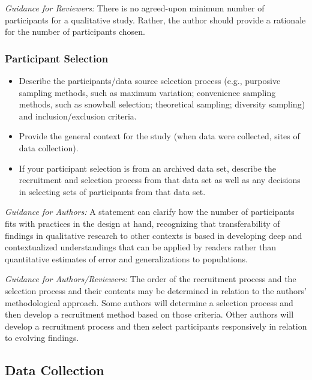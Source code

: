 \documentclass[acmsmall,screen,anonymous,review]{acmart}
\begin{document}
\textit{Guidance for Reviewers:} There is no agreed-upon minimum number of participants for a qualitative study. Rather, the author should provide a rationale for the number of participants chosen.

\subsubsection{Participant Selection}
\begin{itemize}
    \item Describe the participants/data source selection process (e.g., purposive sampling methods,
such as maximum variation; convenience sampling methods, such as snowball selection; theoretical sampling; diversity sampling) and inclusion/exclusion criteria.
\item  Provide the general context for the study (when data were collected, sites of data collection).
\item  If your participant selection is from an archived data set, describe the recruitment and selection process from that data set as well as any decisions in selecting sets of participants from that data set.
\end{itemize}


\textit{Guidance for Authors:} A statement can clarify how the number of participants fits with practices in the design at hand, recognizing that transferability of findings in qualitative research to other contexts
is based in developing deep and contextualized understandings that can be applied by readers rather than quantitative estimates of error and generalizations to populations.

\textit{Guidance for Authors/Reviewers:} The order of the recruitment process and the selection process and their contents may be determined in relation to the authors’ methodological approach. Some authors will determine a selection process and then develop a recruitment method based on those criteria. Other authors will develop a recruitment process and then select participants
responsively in relation to evolving findings.


\subsection{Data Collection}
\end{document}
